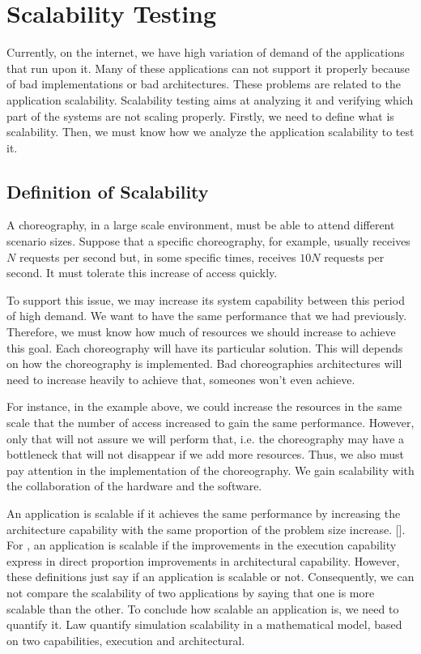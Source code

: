 \section{Scalability Testing}
\label{scalabilityTesting}

Currently, on the internet, we have high variation of demand of the applications that run upon it. Many of these applications can not support it properly because of bad implementations or bad architectures. These problems are related to the application scalability. Scalability testing aims at analyzing it and verifying which part of the systems are not scaling properly. Firstly, we need to define what is scalability. Then, we must know how we analyze the application scalability to test it. 

\subsection{Definition of Scalability}
A choreography, in a large scale environment, must be able to attend different scenario sizes. Suppose that a specific choreography, for example, usually receives $N$ requests per second but, in some specific times, receives $10N$ requests per second. It must tolerate this increase of access quickly.

To support this issue, we may increase its system capability between this period of high demand. We want to have the same performance that we had previously. Therefore, we must know how much of resources we should increase to achieve this goal.  Each choreography will have its particular solution. This will depends on how the choreography is implemented. Bad choreographies architectures will need to increase heavily to achieve that, someones won't even achieve.

For instance, in the example above, we could increase the resources in the same scale that the number of access increased to gain the same performance. However, only that will not assure we will perform that, i.e.  the choreography may have a bottleneck that will not disappear if we add more resources. Thus, we also must pay attention in the implementation of the choreography. We gain scalability with the collaboration of the hardware and the software. 

An application is scalable if it achieves the same performance by increasing the architecture capability with the same proportion of the problem size increase. [\citet{QUINN}]. For \citet{LAW}, an application is scalable if the improvements in the execution capability express in direct proportion improvements in architectural capability. However, these definitions just say if an application is scalable or not. Consequently, we can not compare the scalability of two applications by saying that one is more scalable than the other. To conclude how scalable an application is, we need to quantify it. Law quantify simulation scalability in a mathematical model, based on two capabilities, execution and architectural. 

